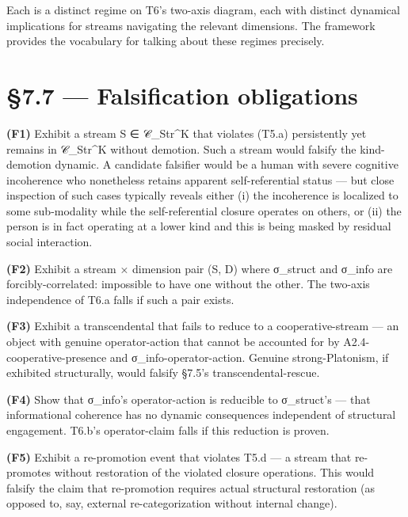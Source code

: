 \documentclass[11pt, openany]{book}
\newcommand{\sectionbreak}{\clearpage}
\begin{document}
Each is a distinct regime on T6's two-axis diagram, each with distinct dynamical implications for streams navigating the relevant dimensions. The framework provides the vocabulary for talking about these regimes precisely.

\sectionbreak

\section{§7.7 --- Falsification obligations}

\textbf{(F1)} Exhibit a stream S ∈ 𝒞\_\allowbreak{}Str\textasciicircum{}K that violates (T5.a) persistently yet remains in 𝒞\_\allowbreak{}Str\textasciicircum{}K without demotion. Such a stream would falsify the kind-demotion dynamic. A candidate falsifier would be a human with severe cognitive incoherence who nonetheless retains apparent self-referential status --- but close inspection of such cases typically reveals either (i) the incoherence is localized to some sub-modality while the self-referential closure operates on others, or (ii) the person is in fact operating at a lower kind and this is being masked by residual social interaction.

\textbf{(F2)} Exhibit a stream × dimension pair (S, D) where σ\_\allowbreak{}struct and σ\_\allowbreak{}info are forcibly-correlated: impossible to have one without the other. The two-axis independence of T6.a falls if such a pair exists.

\textbf{(F3)} Exhibit a transcendental that fails to reduce to a cooperative-stream --- an object with genuine operator-action that cannot be accounted for by A2.4-cooperative-presence and σ\_\allowbreak{}info-operator-action. Genuine strong-Platonism, if exhibited structurally, would falsify §7.5's transcendental-rescue.

\textbf{(F4)} Show that σ\_\allowbreak{}info's operator-action is reducible to σ\_\allowbreak{}struct's --- that informational coherence has no dynamic consequences independent of structural engagement. T6.b's operator-claim falls if this reduction is proven.

\textbf{(F5)} Exhibit a re-promotion event that violates T5.d --- a stream that re-promotes without restoration of the violated closure operations. This would falsify the claim that re-promotion requires actual structural restoration (as opposed to, say, external re-categorization without internal change).

\sectionbreak
\end{document}
